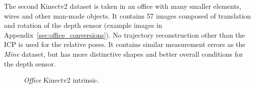 The second Kinectv2 dataset is taken in an office with many smaller elements, wires and other man-made objects.
It contains 57 images composed of translation and rotation of the depth sensor (example images in Appendix~\ref{sec:office_conversions}).
No trajectory reconstruction other than the ICP is used for the relative poses.
It contains similar measurement errors as the \emph{Mine} dataset, but has more distinctive shapes and better overall conditions for the depth sensor.
\begin{figure}[H]
\CenterFloatBoxes%
\begin{floatrow}
    {\caption{\emph{Office} Kinectv2 intrinsic.}\label{tab:office_intrinsic}}%
\end{floatrow}
\end{figure}
